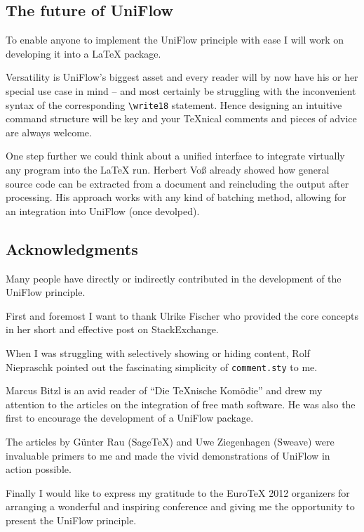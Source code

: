 \documentclass{maps}
\begin{document}
\subsection{The future of UniFlow}
To enable anyone to implement the UniFlow principle with ease I will work on developing it into a \LaTeX{} package.

Versatility is UniFlow's biggest asset and every reader will by now have his or her special use case in mind -- and most certainly be struggling with the inconvenient syntax of the corresponding \verb+\write18+
statement. Hence designing an intuitive command structure will be key and your \TeX{}nical comments and pieces of advice are always welcome.

One step further we could think about a unified interface to integrate virtually any program into the \LaTeX{} run. Herbert Voß \cite{arn:voss} already showed how general source code can be extracted from a document and reincluding the output after processing. His approach works with any kind of batching method, allowing for an integration into UniFlow (once devolped).

\subsection{Acknowledgments}

Many people have directly or indirectly contributed in the development of the UniFlow principle.

First and foremost I want to thank Ulrike Fischer who provided the core concepts in her short and effective post on StackExchange.

When I was struggling with selectively showing or hiding content, Rolf Niepraschk pointed out the fascinating simplicity of \texttt{comment.sty} to me.

Marcus Bitzl is an avid reader of \enquote{Die \TeX{}nische Komödie} and drew my attention to the articles on the integration of free math software. He was also the first to encourage the development of a UniFlow package.

The articles by Günter Rau (Sage\TeX{}) and Uwe Ziegenhagen (Sweave) were invaluable primers to me and made the vivid demonstrations of UniFlow in action possible.

Finally I would like to express my gratitude to the Euro\TeX{} 2012 organizers for arranging a wonderful and inspiring conference and giving me the opportunity to present the UniFlow principle.

\theendnotes



\end{document}
